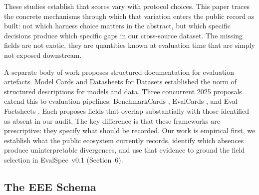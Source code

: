 \documentclass[11pt]{article}
\begin{document}
These studies establish that scores vary with protocol choices. This paper
traces the concrete mechanisms through which that variation enters the public
record as built: not which harness choice matters in the abstract, but which
specific decisions produce which specific gaps in our cross-source dataset. The missing fields are not exotic, they are quantities known at evaluation time that are simply not exposed downstream.

A separate body of work proposes structured documentation for evaluation
artefacts. Model Cards \citep{mitchell2019} and Datasheets for Datasets
\citep{gebru2021} established the norm of structured descriptions for models
and data. Three concurrent 2025 proposals extend this to evaluation pipelines:
BenchmarkCards \citep{sokol2025}, EvalCards \citep{dhar2025}, and Eval
Factsheets \citep{bordes2025}. Each proposes fields that overlap substantially
with those identified as absent in our audit. The key difference is that these
frameworks are prescriptive: they specify what should be recorded. Our work is
empirical first, we establish what the public ecosystem currently records,
identify which absences produce uninterpretable divergences, and use that
evidence to ground the field selection in EvalSpec~v0.1 (Section~6).


\subsection{The EEE Schema}

%
\end{document}
